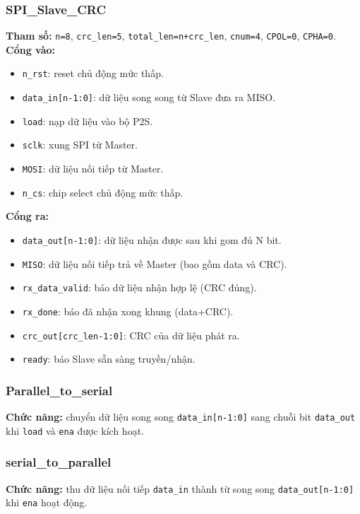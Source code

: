 \subsubsection*{SPI\_Slave\_CRC}
\textbf{Tham số:} \texttt{n=8}, \texttt{crc\_len=5}, \texttt{total\_len=n+crc\_len}, \texttt{cnum=4}, \texttt{CPOL=0}, \texttt{CPHA=0}.\\
\textbf{Cổng vào:}
\begin{itemize}
	\item \texttt{n\_rst}: reset chủ động mức thấp.
	\item \texttt{data\_in[n-1:0]}: dữ liệu song song từ Slave đưa ra MISO.
	\item \texttt{load}: nạp dữ liệu vào bộ P2S.
	\item \texttt{sclk}: xung SPI từ Master.
	\item \texttt{MOSI}: dữ liệu nối tiếp từ Master.
	\item \texttt{n\_cs}: chip select chủ động mức thấp.
\end{itemize}
\textbf{Cổng ra:}
\begin{itemize}
	\item \texttt{data\_out[n-1:0]}: dữ liệu nhận được sau khi gom đủ N bit.
	\item \texttt{MISO}: dữ liệu nối tiếp trả về Master (bao gồm data và CRC).
	\item \texttt{rx\_data\_valid}: báo dữ liệu nhận hợp lệ (CRC đúng).
	\item \texttt{rx\_done}: báo đã nhận xong khung (data+CRC).
	\item \texttt{crc\_out[crc\_len-1:0]}: CRC của dữ liệu phát ra.
	\item \texttt{ready}: báo Slave sẵn sàng truyền/nhận.
\end{itemize}

\subsubsection*{Parallel\_to\_serial}
\textbf{Chức năng:} chuyển dữ liệu song song \texttt{data\_in[n-1:0]} sang chuỗi bit \texttt{data\_out} khi \texttt{load} và \texttt{ena} được kích hoạt.

\subsubsection*{serial\_to\_parallel}
\textbf{Chức năng:} thu dữ liệu nối tiếp \texttt{data\_in} thành từ song song \texttt{data\_out[n-1:0]} khi \texttt{ena} hoạt động.